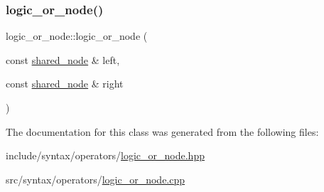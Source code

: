 \subsubsection{\texorpdfstring{logic\+\_\+or\+\_\+node()}{logic\_or\_node()}}
{\footnotesize\ttfamily logic\+\_\+or\+\_\+node\+::logic\+\_\+or\+\_\+node (\begin{DoxyParamCaption}\item[{const \hyperlink{namespacejawe_a3f307481d921b6cbb50cc8511fc2b544}{shared\+\_\+node} \&}]{left,  }\item[{const \hyperlink{namespacejawe_a3f307481d921b6cbb50cc8511fc2b544}{shared\+\_\+node} \&}]{right }\end{DoxyParamCaption})}



The documentation for this class was generated from the following files\+:\begin{DoxyCompactItemize}
\item 
include/syntax/operators/\hyperlink{logic__or__node_8hpp}{logic\+\_\+or\+\_\+node.\+hpp}\item 
src/syntax/operators/\hyperlink{logic__or__node_8cpp}{logic\+\_\+or\+\_\+node.\+cpp}\end{DoxyCompactItemize}
